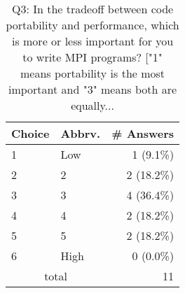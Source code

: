 \begin{table}[htb]%
\begin{center}%
\caption{Q3: In the tradeoff between code portability and performance, which is more or less important for you to write MPI programs? ["1" means portability is the most important and "3" means both are equally...}%
\label{tab:Q3-ans}%
\begin{tabular}{l|l|r}%
\hline%
Choice & Abbrv. & \# Answers \\%
\hline%
1 & Low & 1 (9.1\%) \\%
2 & 2 & 2 (18.2\%) \\%
3 & 3 & 4 (36.4\%) \\%
4 & 4 & 2 (18.2\%) \\%
5 & 5 & 2 (18.2\%) \\%
6 & High & 0 (0.0\%) \\%
\hline%
\multicolumn{2}{c}{total} & 11 \\%
\hline%
\end{tabular}%
\end{center}%
\end{table}%
